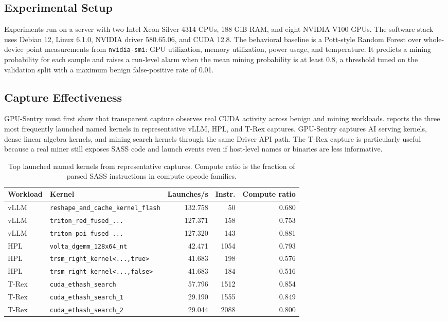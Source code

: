 \subsection{Experimental Setup}

Experiments run on a server with two Intel Xeon Silver 4314 CPUs, 188 GiB RAM, and eight NVIDIA V100 GPUs. The software stack uses Debian 12, Linux 6.1.0, NVIDIA driver 580.65.06, and CUDA 12.8. The behavioral baseline is a Pott-style Random Forest over whole-device point measurements from \texttt{nvidia-smi}: GPU utilization, memory utilization, power usage, and temperature. It predicts a mining probability for each sample and raises a run-level alarm when the mean mining probability is at least 0.8, a threshold tuned on the validation split with a maximum benign false-positive rate of 0.01.

\subsection{Capture Effectiveness}

GPU-Sentry must first show that transparent capture observes real CUDA activity across benign and mining workloads.  reports the three most frequently launched named kernels in representative vLLM, HPL, and T-Rex captures. GPU-Sentry captures AI serving kernels, dense linear algebra kernels, and mining search kernels through the same Driver API path. The T-Rex capture is particularly useful because a real miner still exposes SASS code and launch events even if host-level names or binaries are less informative.

\begin{table}[t]
    \centering
    \caption{Top launched named kernels from representative captures. Compute ratio is the fraction of parsed SASS instructions in compute opcode families.}
    \label{tab:top_kernels}
    \footnotesize
    \begin{tabular}{llrrr}
        \toprule
        Workload & Kernel & Launches/s & Instr. & Compute ratio \\
        \midrule
        vLLM & \texttt{reshape\_and\_cache\_kernel\_flash} & 132.758 & 50 & 0.680 \\
        vLLM & \texttt{triton\_red\_fused\_...} & 127.371 & 158 & 0.753 \\
        vLLM & \texttt{triton\_poi\_fused\_...} & 127.320 & 143 & 0.881 \\
        HPL & \texttt{volta\_dgemm\_128x64\_nt} & 42.471 & 1054 & 0.793 \\
        HPL & \texttt{trsm\_right\_kernel<...,true>} & 41.683 & 198 & 0.576 \\
        HPL & \texttt{trsm\_right\_kernel<...,false>} & 41.683 & 184 & 0.516 \\
        T-Rex & \texttt{cuda\_ethash\_search} & 57.796 & 1512 & 0.854 \\
        T-Rex & \texttt{cuda\_ethash\_search\_1} & 29.190 & 1555 & 0.849 \\
        T-Rex & \texttt{cuda\_ethash\_search\_2} & 29.044 & 2088 & 0.800 \\
        \bottomrule
    \end{tabular}
\end{table}

